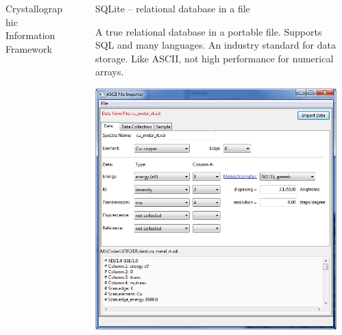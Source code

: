 \documentclass[final]{beamer}
\begin{document}
\begin{frame}{}
\begin{columns}[t]
\begin{column}{.34\linewidth}
\begin{block}{Crystallographic Information Framework}
         \vspace{10mm} {\ }  \vspace{10mm} {\ }

        \end{block}
      \end{column}
      \begin{column}{.01\linewidth}
      \end{column}
      \begin{column}{.31\linewidth}
        \begin{block}{SQLite -- relational database in a file}

          \justifying A true relational database in a portable file. Supports
          SQL and many languages.  An industry standard for
          data storage. Like ASCII, not high performance for numerical
          arrays.

         \vspace{6mm}

         \begin{center}
           \includegraphics[width=0.75\linewidth]{sqlite.png}
         \end{center}

         \vspace{10mm} {\ }   \vspace{10mm} {\ }


        \end{block}
      \end{column}
      \begin{column}{.01\linewidth}
      \end{column}

    \end{columns}
  \end{frame}
\end{document}
